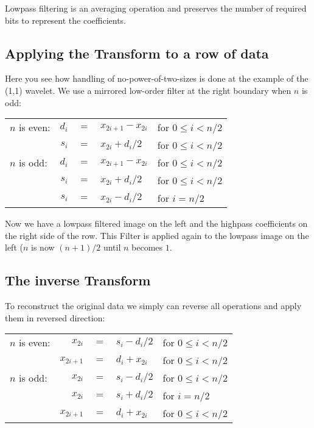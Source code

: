 Lowpass filtering is an averaging operation and preserves the number of 
required bits to represent the coefficients.



\subsection{ Applying the Transform to a row of data }

Here you see how handling of no-power-of-two-sizes is done at the example of the
(1,1) wavelet.
We use a mirrored low-order filter at the right boundary when $n$ is odd:


\begin{center}
\begin{tabular}{lrlll}
\hline
$n$ is even: & $d_{i}$ & $=$ & $x_{2i+1} - x_{2i}$     & for $0 \le i < n/2$ \\
             & $s_{i}$ & $=$ & $x_{2i} + d_{i} / 2$    & for $0 \le i < n/2$ \\
\hline
$n$ is odd:  & $d_{i}$ & $=$ & $x_{2i+1} - x_{2i}$     & for $0 \le i < n/2$ \\
             & $s_{i}$ & $=$ & $x_{2i} + d_{i} / 2$    & for $0 \le i < n/2$ \\
             & $s_{i}$ & $=$ & $x_{2i} - d_{i} / 2$    & for $i = n/2$       \\
\hline
\end{tabular}
\end{center}


Now we have a lowpass filtered image on the left and the highpass coefficients
on the right side of the row. This Filter is applied again to the lowpass image 
on the left ($n$ is now $(n+1)/2$ until $n$ becomes $1$. 



\subsection{ The inverse Transform }

To reconstruct the original data we simply can reverse all operations and apply
them in reversed direction:

\begin{center}
\begin{tabular}{lrlll}
\hline
$n$ is even: & $x_{2i}$ & $=$ & $s_{i} - d_{i} / 2$    &  for $0 \le i < n/2$ \\
             & $x_{2i+1}$ & $=$ & $d_{i} + x_{2i}$     &  for $0 \le i < n/2$ \\
\hline
$n$ is odd: & $x_{2i}$ & $=$ & $s_{i} - d_{i} / 2$    &  for $0 \le i < n/2$ \\
            & $x_{2i}$ & $=$ & $s_{i} + d_{i} / 2$    &  for $i = n/2$       \\
            & $x_{2i+1}$ & $=$ & $d_{i} + x_{2i}$     &  for $0 \le i < n/2$ \\
\hline
\end{tabular}
\end{center}


